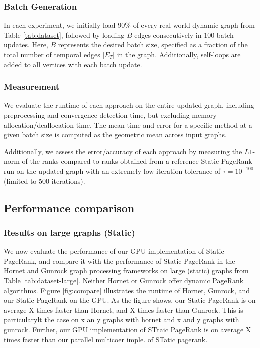 


\subsubsection{Batch Generation}
\label{sec:batch-generation}

In each experiment, we initially load $90\%$ of every real-world dynamic graph from Table \ref{tab:dataset}, followed by loading $B$ edges consecutively in $100$ batch updates. Here, $B$ represents the desired batch size, specified as a fraction of the total number of temporal edges $|E_T|$ in the graph. Additionally, self-loops are added to all vertices with each batch update.


\subsubsection{Measurement}
\label{sec:measurement}

We evaluate the runtime of each approach on the entire updated graph, including preprocessing and convergence detection time, but excluding memory allocation/deallocation time. The mean time and error for a specific method at a given batch size is computed as the geometric mean across input graphs. Additionally, we assess the error/accuracy of each approach by measuring the $L1$-norm \cite{ohsaka2015efficient} of the ranks compared to ranks obtained from a reference Static PageRank run on the updated graph with an extremely low iteration tolerance of $\tau = 10^{-100}$ (limited to $500$ iterations).




\subsection{Performance comparison}

\subsubsection{Results on large graphs (Static)}

We now evaluate the performance of our GPU implementation of Static PageRank, and compare it with the performance of Static PageRank in the Hornet and Gunrock graph processing frameworks on large (static) graphs from Table \ref{tab:dataset-large}. Neither Hornet or Gunrock offer dynamic PageRank algorithms. Figure \ref{fig:compare} illustrates the runtime of Hornet, Gunrock, and our Static PageRank on the GPU. As the figure shows, our Static PageRank is on average X times faster than Hornet, and X times faster than Gunrock. This is particularylt the case on x an y graphs with hornet and x and y graphs with gunrock. Further, our GPU implementation of STtaic PageRank is on average X times faster than our parallel multicoer imple. of STatic pagerank.

